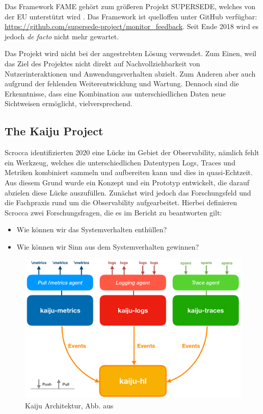Das Framework FAME gehört zum größeren Projekt SUPERSEDE, welches von der EU unterstützt wird \cite{EUSponsorshipFAME}. Das Framework ist quelloffen unter GitHub verfügbar: \url{https://github.com/supersede-project/monitor_feedback}. Seit Ende 2018 wird es jedoch \textit{de facto} nicht mehr gewartet.

Das Projekt wird nicht bei der angestrebten Lösung verwendet. Zum Einen, weil das Ziel des Projektes nicht direkt auf Nachvollziehbarkeit von Nutzerinteraktionen und Anwendungsverhalten abzielt. Zum Anderen aber auch aufgrund der fehlenden Weiterentwicklung und Wartung. Dennoch sind die Erkenntnisse, dass eine Kombination aus unterschiedlichen Daten neue Sichtweisen ermöglicht, vielversprechend.

\subsection{The Kaiju Project}

Scrocca \etal \cite{TheKaijuProjectPaper} identifizierten 2020 eine Lücke im Gebiet der Observability, nämlich fehlt ein Werkzeug, welches die unterschiedlichen Datentypen Logs, Traces und Metriken kombiniert sammeln und aufbereiten kann und dies in quasi-Echtzeit. Aus diesem Grund wurde ein Konzept und ein Prototyp entwickelt, die darauf abzielen diese Lücke auszufüllen. Zunächst wird jedoch das Forschungsfeld und die Fachpraxis rund um die Observability aufgearbeitet. Hierbei definieren Scrocca \etal zwei Forschungsfragen, die es im Bericht zu beantworten gilt:

\begin{itemize}
	\item Wie können wir das Systemverhalten enthüllen?
	\item Wie können wir Sinn aus dem Systemverhalten gewinnen?
\end{itemize}

\begin{figure}
\centering
\includegraphics[width=\linewidth]{img/03_methoden/kaiju_architecture.png}
\caption{Kaiju Architektur, Abb. aus \cite{TheKaijuProjectPaper}}
\label{fig:kaiju_architecture}
\end{figure}

